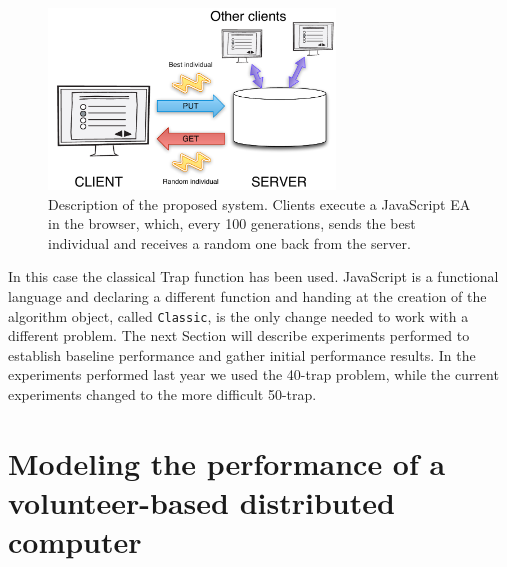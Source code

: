 \documentclass[letterpaper]{article}
\begin{document}
\begin{figure}[!t]
\centering
\includegraphics[width=3in]{system.pdf}
\caption{Description of the proposed system. Clients execute a JavaScript EA
  in the browser, which, every 100 generations, sends the best
  individual and receives a random one back from the server.}
\label{fig:system}
\end{figure}

In this case the classical Trap function \citep{Ackley1987} has been
used. JavaScript is a functional language and declaring a different 
function and handing at the creation of the algorithm object, called
{\tt Classic}, is the only change needed to work with a different
problem. The next Section will describe experiments performed to
establish baseline performance and gather initial performance
results. In the experiments performed last year we used the 40-trap
problem, while the current experiments changed to the more difficult 50-trap.

\section{Modeling the performance of a volunteer-based distributed computer} 
\label{sec:experiments}
\end{document}
